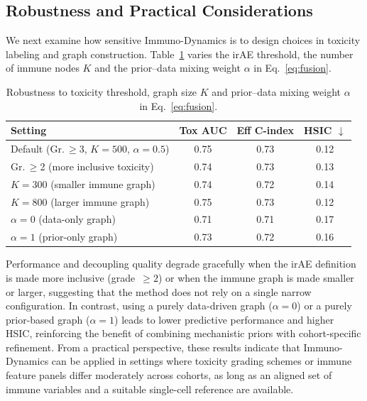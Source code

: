 \documentclass{article}
\begin{document}
\subsection{Robustness and Practical Considerations}

We next examine how sensitive Immuno-Dynamics is to design choices in toxicity labeling and graph construction. Table~\ref{tab:robustness} varies the irAE threshold, the number of immune nodes $K$ and the prior--data mixing weight $\alpha$ in Eq.~\eqref{eq:fusion}.

\begin{table}[t]
\small
\centering
\setlength{\tabcolsep}{3pt}
\caption{Robustness to toxicity threshold, graph size $K$ and prior--data mixing weight $\alpha$ in Eq.~\eqref{eq:fusion}.}
\label{tab:robustness}
\begin{tabularx}{\linewidth}{X c c c}
\toprule
\textbf{Setting} & \textbf{Tox AUC} & \textbf{Eff C-index} & \textbf{HSIC} $\downarrow$ \\
\midrule
Default (Gr.\,$\ge$3, $K{=}500$, $\alpha{=}0.5$) & 0.75 & 0.73 & 0.12 \\
Gr.\,$\ge$2 (more inclusive toxicity)           & 0.74 & 0.73 & 0.13 \\
$K{=}300$ (smaller immune graph)               & 0.74 & 0.72 & 0.14 \\
$K{=}800$ (larger immune graph)                & 0.75 & 0.73 & 0.12 \\
$\alpha{=}0$ (data-only graph)                 & 0.71 & 0.71 & 0.17 \\
$\alpha{=}1$ (prior-only graph)                & 0.73 & 0.72 & 0.16 \\
\bottomrule
\end{tabularx}
\end{table}

Performance and decoupling quality degrade gracefully when the irAE definition is made more inclusive (grade~$\ge 2$) or when the immune graph is made smaller or larger, suggesting that the method does not rely on a single narrow configuration. In contrast, using a purely data-driven graph ($\alpha{=}0$) or a purely prior-based graph ($\alpha{=}1$) leads to lower predictive performance and higher HSIC, reinforcing the benefit of combining mechanistic priors with cohort-specific refinement. From a practical perspective, these results indicate that Immuno-Dynamics can be applied in settings where toxicity grading schemes or immune feature panels differ moderately across cohorts, as long as an aligned set of immune variables and a suitable single-cell reference are available.
\end{document}

